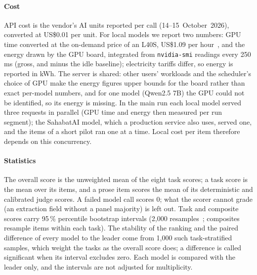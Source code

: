 \paragraph{Cost} API cost is the vendor's AI units reported per call (14--15~October~2026), converted at US\$0.01 per unit. For local models we report two numbers: GPU time converted at the on-demand price of an L40S, US\$1.09 per hour~\cite{runpodl40s}, and the energy drawn by the GPU board, integrated from \texttt{nvidia-smi} readings every 250\,ms (gross, and minus the idle baseline); electricity tariffs differ, so energy is reported in kWh. The server is shared: other users' workloads and the scheduler's choice of GPU make the energy figures upper bounds for the board rather than exact per-model numbers, and for one model (Qwen2.5 7B) the GPU could not be identified, so its energy is missing. In the main run each local model served three requests in parallel (GPU time and energy then measured per run segment); the SahabatAI model, which a production service also uses, served one, and the items of a short pilot ran one at a time. Local cost per item therefore depends on this concurrency.

\paragraph{Statistics} The overall score is the unweighted mean of the eight task scores; a task score is the mean over its items, and a prose item scores the mean of its deterministic and calibrated judge scores. A failed model call scores 0; what the scorer cannot grade (an extraction field without a panel majority) is left out. Task and composite scores carry 95\,\% percentile bootstrap intervals (2{,}000 resamples~\cite{efron1979bootstrap}; composites resample items within each task). The stability of the ranking and the paired difference of every model to the leader come from 1{,}000 such task-stratified samples, which weight the tasks as the overall score does; a difference is called significant when its interval excludes zero. Each model is compared with the leader only, and the intervals are not adjusted for multiplicity.
